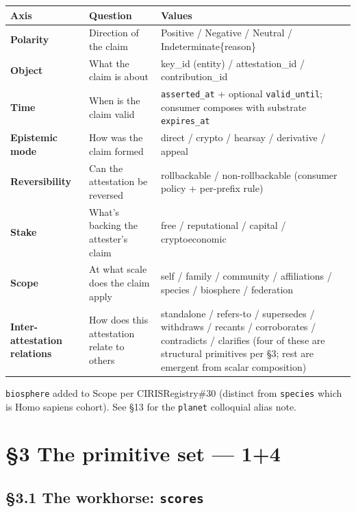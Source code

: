 \documentclass[11pt]{article}
\begin{document}
{\footnotesize
\begin{longtable}{|p{5.33cm}|p{5.33cm}|p{5.33cm}|}\hline
\textbf{Axis} & \textbf{Question} & \textbf{Values} \\ \hline\endhead
\textbf{Polarity} & Direction of the claim & Positive / Negative / Neutral / Indeterminate\{reason\} \\ \hline
\textbf{Object} & What the claim is about & key\_id (entity) / attestation\_id / contribution\_id \\ \hline
\textbf{Time} & When is the claim valid & \texttt{asserted\_at} + optional \texttt{valid\_until}; consumer composes with substrate \texttt{expires\_at} \\ \hline
\textbf{Epistemic mode} & How was the claim formed & direct / crypto / hearsay / derivative / appeal \\ \hline
\textbf{Reversibility} & Can the attestation be reversed & rollbackable / non-rollbackable (consumer policy + per-prefix rule) \\ \hline
\textbf{Stake} & What's backing the attester's claim & free / reputational / capital / cryptoeconomic \\ \hline
\textbf{Scope} & At what scale does the claim apply & self / family / community / affiliations / species / biosphere / federation \\ \hline
\textbf{Inter-attestation relations} & How does this attestation relate to others & standalone / refers-to / supersedes / withdraws / recants / corroborates / contradicts / clarifies (four of these are structural primitives per §3; rest are emergent from scalar composition) \\ \hline
\end{longtable}}


\texttt{biosphere} added to Scope per CIRISRegistry\#30 (distinct from \texttt{species} which is Homo sapiens cohort). See §13 for the \texttt{planet} colloquial alias note.




\clearpage


\section*{§3 The primitive set — 1+4}


\subsection*{§3.1 The workhorse: \texttt{scores}}
\end{document}
